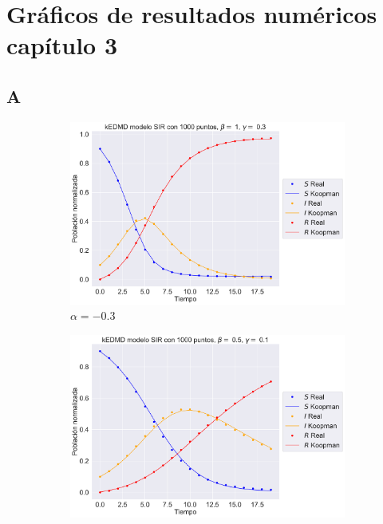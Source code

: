 \chapter{Gráficos de resultados numéricos capítulo 3}

\section{A}

\begin{figure}[htbp]
    \centering
    \begin{subfigure}[b]{0.45\textwidth}
        \centering
        \includegraphics[width=\textwidth]{img/content/chapter3/SIR1.pdf}
        \caption{$\alpha=-0.3$}
        \label{fig:image1}
    \end{subfigure}
    \hfill
    \begin{subfigure}[b]{0.45\textwidth}
        \centering
        \includegraphics[width=\textwidth]{img/content/chapter3/SIR2.pdf}

\end{subfigure}
\end{figure}
